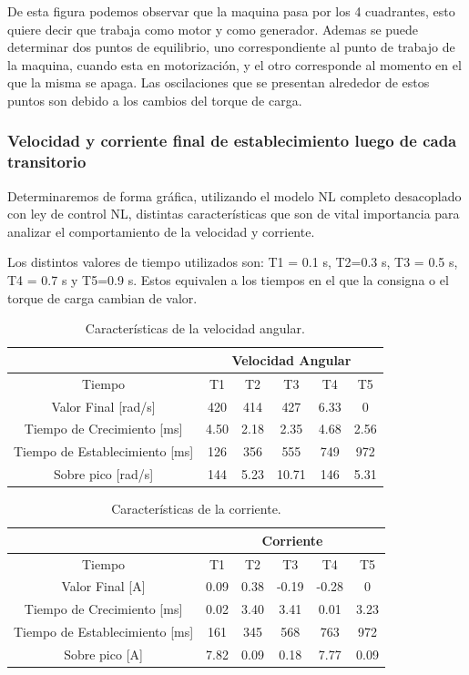 \documentclass{article}
\begin{document}
De esta figura podemos observar que la maquina pasa por los 4 cuadrantes, esto quiere decir que trabaja como 
motor y como generador. Ademas se puede determinar dos puntos de equilibrio, uno correspondiente al punto 
de trabajo de la maquina, cuando esta en motorización, y el otro corresponde al momento en el que la misma se apaga.
Las oscilaciones que se presentan alrededor de estos puntos son debido a los cambios del torque de carga.

\subsubsection{Velocidad y corriente final de establecimiento luego de cada transitorio}

Determinaremos de forma gráfica, utilizando el modelo NL completo desacoplado con ley de control  NL, 
distintas características que son de vital importancia para analizar el comportamiento de la velocidad 
y corriente.

Los distintos valores de tiempo utilizados son: T1 = 0.1 s, T2=0.3 s, T3 = 0.5 s, T4 = 0.7 s y T5=0.9 s. 
Estos equivalen a los tiempos en el que la consigna o el torque de carga cambian de valor.

\begin{table}[H]
    \centering
    \begin{tabular}{|c|c|c|c|c|c|}
        \hline
        & \multicolumn{5}{c|}{Velocidad Angular} \\
        \hline
        Tiempo & T1 & T2 & T3 & T4 & T5 \\
        \hline
        Valor Final [rad/s] & 420 & 414 & 427 & 6.33 & 0 \\
        \hline
        Tiempo de Crecimiento [ms] & 4.50 & 2.18 & 2.35 & 4.68 & 2.56 \\
        \hline
        Tiempo de Establecimiento [ms] & 126 & 356 & 555 & 749 & 972 \\
        \hline
        Sobre pico [rad/s] & 144 & 5.23 & 10.71 & 146 & 5.31 \\
        \hline
    \end{tabular}
    \caption{Características de la velocidad angular.}
\end{table}

\begin{table}[H]
    \centering
    \begin{tabular}{|c|c|c|c|c|c|}
        \hline
        & \multicolumn{5}{c|}{Corriente} \\
        \hline
        Tiempo & T1 & T2 & T3 & T4 & T5 \\
        \hline
        Valor Final [A]& 0.09 & 0.38 & -0.19 & -0.28 & 0 \\
        \hline
        Tiempo de Crecimiento [ms] & 0.02 & 3.40 & 3.41 & 0.01 & 3.23 \\
        \hline
        Tiempo de Establecimiento [ms] & 161 & 345 & 568 & 763 & 972 \\
        \hline
        Sobre pico [A] & 7.82 & 0.09 & 0.18 & 7.77 & 0.09 \\
        \hline
    \end{tabular}
    \caption{Características de la corriente.}
\end{table}
\end{document}
